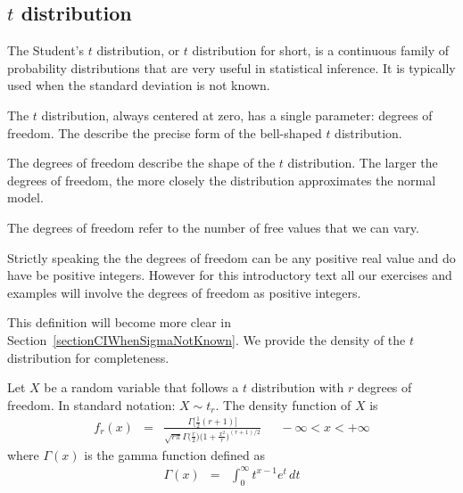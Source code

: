 \subsection{$t$ distribution}
\label{introducingTheTDistribution}


The Student's $t$ distribution, or $t$ distribution for short, is a continuous family of probability distributions
that are very useful in statistical inference.
It is typically used when the standard deviation is not known.

The $t$ distribution, always centered at zero, has a single parameter: degrees of freedom. The  describe the precise form of the bell-shaped $t$ distribution. 

\begin{termBox}{
The degrees of freedom describe the shape of the $t$ distribution. The larger the degrees of freedom, the more closely the distribution approximates the normal model.}
\end{termBox}

The degrees of freedom refer to the number of free values that we can vary.


\begin{tipBox}{
Strictly speaking the the degrees of freedom can be any positive real value 
and do have be positive integers.
However for this introductory text all our exercises and examples will involve the degrees of freedom as positive integers.
}
\end{tipBox}


This definition will become more clear in Section~\ref{sectionCIWhenSigmaNotKnown}.
We provide the density of the $t$ distribution for completeness.

\begin{termBox}{ 
Let $X$ be a random variable that follows a $t$ distribution with $r$ degrees of freedom.
In standard notation: $X \sim t_{r}$.
The density function of $X$ is 
\begin{eqnarray}
f_{r}(x) & = &\displaystyle\frac{ \Gamma \bigg[ \frac{1}{2}(r+1) \bigg]}{ \sqrt{r \pi} \Gamma \bigg(\frac{r}{2} \bigg) \bigg(1 + \frac{x^{2}}{r} \bigg)^{(r+1)/2} }
~\quad~	-\infty < x < +\infty	\label{tDensity}
\end{eqnarray}
where $\Gamma(x)$ is the gamma function defined as
\begin{eqnarray}
\Gamma(x) & = &	\int_{0}^{\infty} t^{x-1} e^{t} \, dt	\label{gammaFunction}
\end{eqnarray}
}
\end{termBox}

